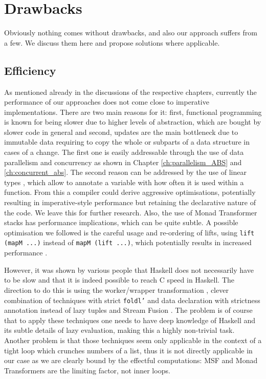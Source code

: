 \section{Drawbacks}
\label{sec:drawbacks}
Obviously nothing comes without drawbacks, and also our approach suffers from a few. We discuss them here and propose solutions where applicable.

\subsection{Efficiency}
\label{sec:drawback_efficiency}
As mentioned already in the discussions of the respective chapters, currently the performance of our approaches does not come close to imperative implementations. There are two main reasons for it: first, functional programming is known for being slower due to higher levels of abstraction, which are bought by slower code in general and second, updates are the main bottleneck due to immutable data requiring to copy the whole or subparts of a data structure in cases of a change. The first one is easily addressable through the use of data parallelism and concurrency as shown in Chapter \ref{ch:parallelism_ABS} and \ref{ch:concurrent_abs}. The second reason can be addressed by the use of linear types \cite{bernardy_linear_2017}, which allow to annotate a variable with how often it is used within a function. From this a compiler could derive aggressive optimisations, potentially resulting in imperative-style performance but retaining the declarative nature of the code. We leave this for further research. Also, the use of Monad Transformer stacks has performance implications, which can be quite subtle. A possible optimisation we followed is the careful usage and re-ordering of lifts, using \texttt{lift (mapM ...)} instead of \texttt{mapM (lift ...)}, which potentially results in increased performance .

However, it was shown by various people \cite{kqr_competing_2017, stewart_haskell_2008, stolarek_haskell_2013} that Haskell does not necessarily have to be slow and that it is indeed possible to reach C speed in Haskell. The direction to do this is using the worker/wrapper transformation \cite{gill_worker/wrapper_2009}, clever combination of techniques with strict \texttt{foldl'} and data declaration with strictness annotation instead of lazy tuples and Stream Fusion \cite{coutts_stream_2007, mainland_haskell_2013}. The problem is of course that to apply these techniques one needs to have deep knowledge of Haskell and its subtle details of lazy evaluation, making this a highly non-trivial task. Another problem is that those techniques seem only applicable in the context of a tight loop which crunches numbers of a list, thus it is not directly applicable in our case as we are clearly bound by the effectful computations: MSF and Monad Transformers are the limiting factor, not inner loops.


